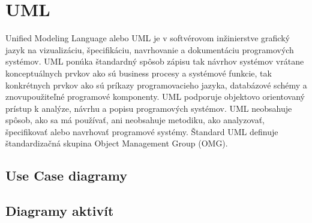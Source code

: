 \section{\acl{UML}}
Unified Modeling Language alebo UML je v softvérovom inžinierstve grafický jazyk na vizualizáciu, špecifikáciu, navrhovanie a dokumentáciu programových systémov. UML ponúka štandardný spôsob zápisu tak návrhov systémov vrátane konceptuálnych prvkov ako sú business procesy a systémové funkcie, tak konkrétnych prvkov ako sú príkazy programovacieho jazyka, databázové schémy a znovupoužiteľné programové komponenty. UML podporuje objektovo orientovaný prístup k analýze, návrhu a popisu programových systémov. UML neobsahuje spôsob, ako sa má používať, ani neobsahuje metodiku, ako analyzovať, špecifikovať alebo navrhovať programové systémy. Štandard UML definuje štandardizačná skupina Object Management Group (OMG).
\subsection{Use Case diagramy}
\subsection{Diagramy aktivít}


